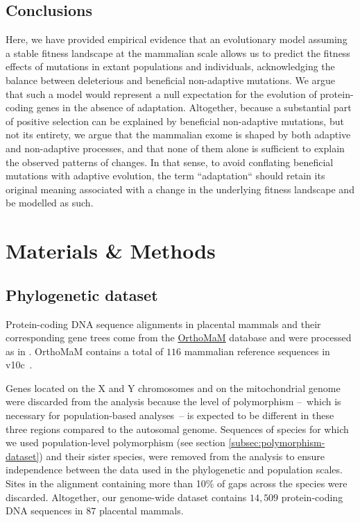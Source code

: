 \documentclass{article}
\begin{document}
    \subsection*{Conclusions}

    Here, we have provided empirical evidence that an evolutionary model assuming a stable fitness landscape at the mammalian scale allows us to predict the fitness effects of mutations in extant populations and individuals, acknowledging the balance between deleterious and beneficial non-adaptive mutations.
    We argue that such a model would represent a null expectation for the evolution of protein-coding genes in the absence of adaptation.
    Altogether, because a substantial part of positive selection can be explained by beneficial non-adaptive mutations, but not its entirety, we argue that the mammalian exome is shaped by both adaptive and non-adaptive processes, and that none of them alone is sufficient to explain the observed patterns of changes.
    In that sense, to avoid conflating beneficial mutations with adaptive evolution, the term ``adaptation`` should retain its original meaning associated with a change in the underlying fitness landscape and be modelled as such.

    \section{Materials \& Methods}
    \label{sec:methods}

    \subsection{Phylogenetic dataset}\label{subsec:phylo-dataset}

    Protein-coding DNA sequence alignments in placental mammals and their corresponding gene trees come from the \href{https://www.orthomam.univ-montp2.fr}{OrthoMaM} database and were processed as in \textcite{latrille_genes_2023}.
    OrthoMaM contains a total of $116$ mammalian reference sequences in v10c~\cite{ranwez_orthomam_2007, douzery_orthomam_2014, scornavacca_orthomam_2019}.

    Genes located on the X and Y chromosomes and on the mitochondrial genome were discarded from the analysis because the level of polymorphism –~which is necessary for population-based analyses~– is expected to be different in these three regions compared to the autosomal genome.
    Sequences of species for which we used population-level polymorphism (see section \ref{subsec:polymorphism-dataset}) and their sister species, were removed from the analysis to ensure independence between the data used in the phylogenetic and population scales.
    Sites in the alignment containing more than 10\% of gaps across the species were discarded.
    Altogether, our genome-wide dataset contains $14,509$ protein-coding DNA sequences in $87$ placental mammals.
\end{document}
